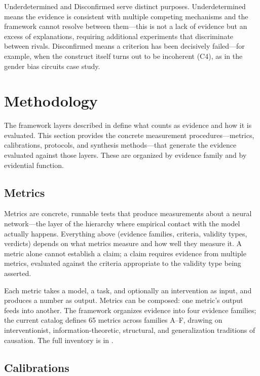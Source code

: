 \documentclass{article}
\begin{document}
Underdetermined and Disconfirmed serve distinct purposes. Underdetermined means the evidence is consistent with multiple competing mechanisms and the framework cannot resolve between them---this is not a lack of evidence but an excess of explanations, requiring additional experiments that discriminate between rivals. Disconfirmed means a criterion has been decisively failed---for example, when the construct itself turns out to be incoherent (C4), as in the gender bias circuits case study.

\section{Methodology}
\label{sec:methodology}

The framework layers described in  define what counts as evidence and how it is evaluated. This section provides the concrete measurement procedures---metrics, calibrations, protocols, and synthesis methods---that generate the evidence evaluated against those layers. These are organized by evidence family and by evidential function.

\subsection{Metrics}
\label{sec:metrics}

Metrics are concrete, runnable tests that produce measurements about a neural network---the layer of the hierarchy where empirical contact with the model actually happens. Everything above (evidence families, criteria, validity types, verdicts) depends on what metrics measure and how well they measure it. A metric alone cannot establish a claim; a claim requires evidence from multiple metrics, evaluated against the criteria appropriate to the validity type being asserted.

Each metric takes a model, a task, and optionally an intervention as input, and produces a number as output. Metrics can be composed: one metric's output feeds into another. The framework organizes evidence into four evidence families; the current catalog defines 65 metrics across families A--F, drawing on interventionist, information-theoretic, structural, and generalization traditions of causation. The full inventory is in .

\subsection{Calibrations}
\label{sec:calibrations}
\end{document}
